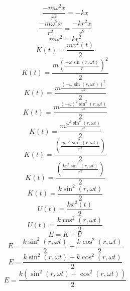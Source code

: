 \documentclass[a4paper,12pt]{report}
\begin{document}
\begin{equation}
\frac{-m \omega^2 x}{r^2} = -kx
\end{equation}
\begin{equation}
\frac{-m \omega^2 x}{r^2} = \frac{-kr^2x}{r^2}
\end{equation}
\begin{equation}
m \omega^2 = kr^2
\end{equation}
\begin{equation}
K(t) = \frac{mv^2(t)}{2}
\end{equation}
\begin{equation}
K(t) = \frac{m \left(\frac{-\omega \sin(r,\omega t)}{r}\right)^2}{2}
\end{equation}
\begin{equation}
K(t) = \frac{m \frac{(-\omega \sin(r,\omega t))^2}{r^2}}{2}
\end{equation}
\begin{equation}
K(t) = \frac{m \frac{(-\omega)^2 \sin^2(r,\omega t)}{r^2}}{2}
\end{equation}
\begin{equation}
K(t) = \frac{m \frac{\omega^2 \sin^2(r,\omega t)}{r^2}}{2}
\end{equation}
\begin{equation}
K(t) = \frac{\left(\frac{m \omega^2 \sin^2(r,\omega t)}{r^2}\right)}{2}
\end{equation}
\begin{equation}
K(t) = \frac{\left(\frac{kr^2 \sin^2(r,\omega t)}{r^2}\right)}{2}
\end{equation}
\begin{equation}
K(t) = \frac{k \sin^2(r,\omega t)}{2}
\end{equation}
\begin{equation}
U(t) = \frac{kx^2(t)}{2}
\end{equation}
\begin{equation}
U(t) = \frac{k \cos^2(r,\omega t)}{2}
\end{equation}
\begin{equation}
E = K + U
\end{equation}
\begin{equation}
E = \frac{k \sin^2(r,\omega t)}{2} + \frac{k \cos^2(r,\omega t)}{2}
\end{equation}
\begin{equation}
E = \frac{k \sin^2(r,\omega t) + k \cos^2(r,\omega t)}{2}
\end{equation}
\begin{equation}
E = \frac{k (\sin^2(r,\omega t) + \cos^2(r,\omega t))}{2}
\end{equation}
\end{document}
